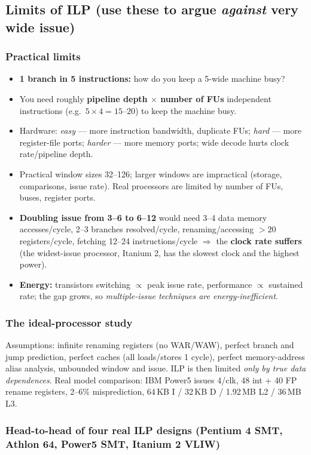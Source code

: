 \subsection{Limits of ILP (use these to argue \emph{against} very wide issue)}
\subsubsection{Practical limits}
\begin{itemize}
\item \textbf{1 branch in 5 instructions:} how do you keep a 5-wide machine busy?
\item You need roughly \textbf{pipeline depth $\times$ number of FUs} independent instructions (e.g.\ $5\times4=15$--$20$) to keep the machine busy.
\item Hardware: \emph{easy} --- more instruction bandwidth, duplicate FUs; \emph{hard} --- more register-file ports; \emph{harder} --- more memory ports; wide decode hurts clock rate/pipeline depth.
\item Practical window sizes 32--126; larger windows are impractical (storage, comparisons, issue rate). Real processors are limited by number of FUs, buses, register ports.
\item \textbf{Doubling issue from 3--6 to 6--12} would need 3--4 data memory accesses/cycle, 2--3 branches resolved/cycle, renaming/accessing $>20$ registers/cycle, fetching 12--24 instructions/cycle $\Rightarrow$ the \textbf{clock rate suffers} (the widest-issue processor, Itanium 2, has the slowest clock and the highest power).
\item \textbf{Energy:} transistors switching $\propto$ peak issue rate, performance $\propto$ sustained rate; the gap grows, so \emph{multiple-issue techniques are energy-inefficient}.
\end{itemize}

\subsubsection{The ideal-processor study}
Assumptions: infinite renaming registers (no WAR/WAW), perfect branch and jump prediction, perfect caches (all loads/stores 1 cycle), perfect memory-address alias analysis, unbounded window and issue. ILP is then limited \emph{only by true data dependences}. Real model comparison: IBM Power5 issues 4/clk, 48 int + 40 FP rename registers, 2--6\% misprediction, 64\,KB I / 32\,KB D / 1.92\,MB L2 / 36\,MB L3.

\subsubsection{Head-to-head of four real ILP designs (Pentium 4 SMT, Athlon 64, Power5 SMT, Itanium 2 VLIW)}

